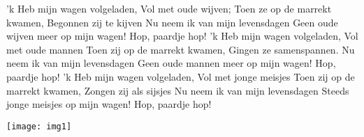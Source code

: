 \beginverse*
'k Heb mijn wagen volgeladen,
Vol met oude wijven;
Toen ze op de marrekt kwamen,
Begonnen zij te kijven
Nu neem ik van mijn levensdagen
Geen oude wijven meer op mijn wagen!
Hop, paardje hop!
\endverse
\beginverse*
'k Heb mijn wagen volgeladen,
Vol met oude mannen
Toen zij op de marrekt kwamen,
Gingen ze samenspannen.
Nu neem ik van mijn levensdagen
Geen oude mannen meer op mijn wagen!
Hop, paardje hop!
\endverse
\beginverse*
'k Heb mijn wagen volgeladen,
Vol met jonge meisjes
Toen zij op de marrekt kwamen,
Zongen zij als sijsjes
Nu neem ik van mijn levensdagen
Steeds jonge meisjes op mijn wagen!
Hop, paardje hop!
\endverse
\endsong
\begin{intersong}
    \texttt{[image: img1]}
\end{intersong}